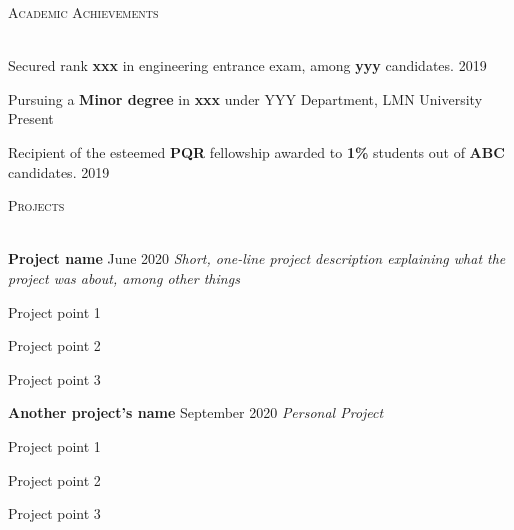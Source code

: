 \documentclass[12pt]{article}   %
\renewcommand{\section}[1]{
    \textsc{#1}
    \vspace*{-10pt} \\ \hspace*{-5pt} 
    \hrulefill \\
    \vspace*{-15pt}
}
\newcommand{\smallbullet}{
    \small$\bullet$
}
\newenvironment{bullet-list-major}{
    \begin{list}{
        \smallbullet
    }{
        \setlength\leftmargin{15pt}\topsep 0pt \itemsep -4pt
    }
} {
    \end{list}
}
\newcommand{\bigblock}[3]{
    {
        \hspace*{5pt} \textbf{#1} \hfill #2 \newline
        \hspace*{5pt} \textit{#3}
    }
}
\newenvironment{bullet-list-minor}{
    \begin{list}{
        \smallbullet
    }{
        \setlength\leftmargin{30pt}\topsep 0pt \itemsep -3pt
    }
} {
    \end{list}
}
\begin{document}
    \vspace*{48.63mm}   %



    \section{Academic Achievements}
    \begin{bullet-list-major}
        \item Secured rank \textbf{xxx} in engineering entrance exam, among \textbf{yyy} candidates. \hfill 2019
        \item Pursuing a \textbf{Minor degree} in \textbf{xxx} under YYY Department, LMN University \hfill Present
        \item Recipient of the esteemed \textbf{PQR} fellowship awarded to \textbf{1\%} students out
        of \textbf{ABC} candidates. \hfill 2019
    \end{bullet-list-major}


    \section{Projects}

    \bigblock{
        Project name
    }{
        June 2020
    }{
        Short, one-line project description explaining what the project was about, among other things
    }
	\begin{bullet-list-minor}
        \item Project point 1
        \item Project point 2
        \item Project point 3
    \end{bullet-list-minor}
    

    \bigblock{
        Another project's name
    }{
        September 2020
    }{
        Personal Project
    }
	\begin{bullet-list-minor}
        \item Project point 1
        \item Project point 2
        \item Project point 3
    \end{bullet-list-minor}
\end{document}
